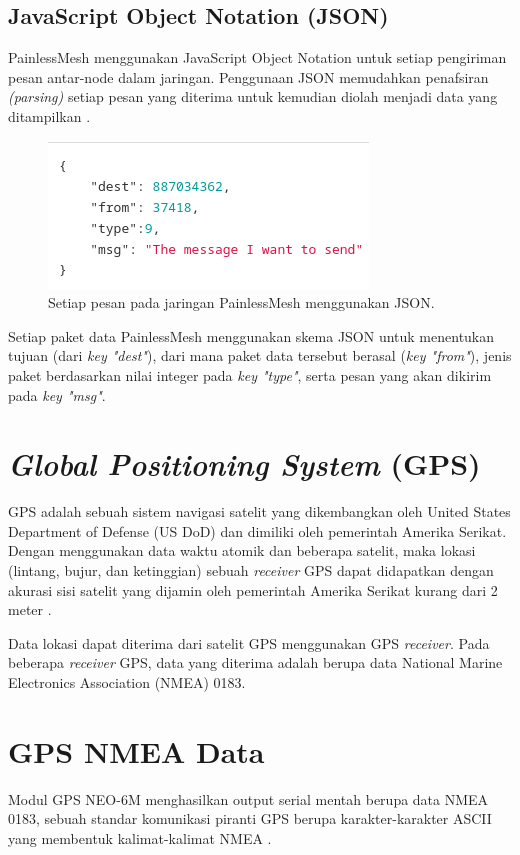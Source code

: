 \subsection{JavaScript Object Notation (JSON)}
PainlessMesh menggunakan JavaScript Object Notation untuk setiap pengiriman pesan antar-node dalam jaringan. Penggunaan JSON memudahkan penafsiran \textit{(parsing)} setiap pesan yang diterima untuk kemudian diolah menjadi data yang ditampilkan \cite{MeshProtocolWiki}.

\begin{figure}[h]
	\centering
	\includegraphics[scale=0.5]{./assets/PainlessMeshJSON}
	\caption{Setiap pesan pada jaringan PainlessMesh menggunakan JSON.}
\end{figure}

Setiap paket data PainlessMesh menggunakan skema JSON untuk menentukan tujuan (dari \textit{key "dest"}), dari mana paket data tersebut berasal (\textit{key "from"}), jenis paket berdasarkan nilai integer pada \textit{key "type"}, serta pesan yang akan dikirim pada \textit{key "msg"}.

\section{\textit{Global Positioning System} (GPS)}
GPS adalah sebuah sistem navigasi satelit yang dikembangkan oleh United States Department of Defense (US DoD) dan dimiliki oleh pemerintah Amerika Serikat. Dengan menggunakan data waktu atomik dan beberapa satelit, maka lokasi (lintang, bujur, dan ketinggian) sebuah \textit{receiver} GPS dapat didapatkan dengan akurasi sisi satelit yang dijamin oleh pemerintah Amerika Serikat kurang dari 2 meter \cite{noauthor_gpsgov_nodate}.

Data lokasi dapat diterima dari satelit GPS menggunakan GPS \textit{receiver}. Pada beberapa \textit{receiver} GPS, data yang diterima adalah berupa data National Marine Electronics Association (NMEA) 0183.

\section{GPS NMEA Data}
Modul GPS NEO-6M menghasilkan output serial mentah berupa data NMEA 0183, sebuah standar komunikasi piranti GPS berupa karakter-karakter ASCII yang membentuk kalimat-kalimat NMEA \cite{GPSNMEASentence}.

